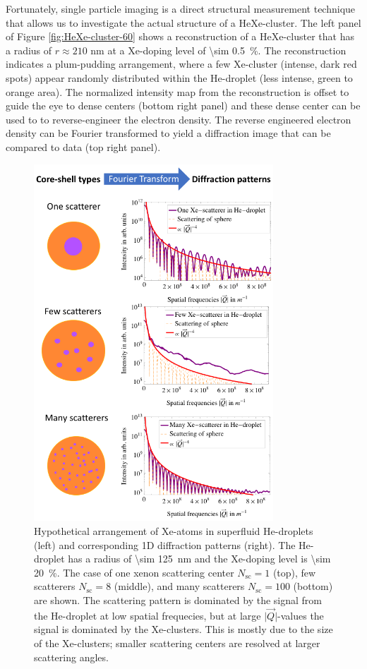 Fortunately, single particle imaging is a direct structural measurement technique that allows us to investigate the actual structure of a HeXe-cluster. The left panel of Figure \ref{fig:HeXe-cluster-60} shows a reconstruction of a HeXe-cluster that has a radius of $r\approx 210$ nm at a Xe-doping level of \SI{\sim 0.5}{\percent}. The reconstruction indicates a plum-pudding arrangement, where a few Xe-cluster (intense, dark red spots) appear randomly distributed within the He-droplet (less intense, green to orange area). The normalized intensity map from the reconstruction is offset to guide the eye to dense centers (bottom right panel) and these dense center can be used to to reverse-engineer the electron density. The reverse engineered electron density can be Fourier transformed to yield a diffraction image that can be compared to data (top right panel).
%
\begin{figure}
 	\centering
 		\includegraphics[width=0.80\textwidth]{images/results/plum-pudding.png}
 	\caption[Hypothetical arrangement of Xe-clusters within He-droplets.]{Hypothetical arrangement of Xe-atoms in superfluid He-droplets (left) and corresponding 1D diffraction patterns (right). The He-droplet has a radius of \SI{\sim 125}{\nano\meter} and the Xe-doping level is \SI{\sim 20}{\percent}. The case of one xenon scattering center $N_{\text{sc}}=1$ (top), few scatterers $N_{\text{sc}}=8$ (middle), and many scatterers $N_{\text{sc}}=100$ (bottom) are shown. The scattering pattern is dominated by the signal from the He-droplet at low spatial frequecies, but at large $\lvert\vec{Q}\rvert$-values the signal is dominated by the Xe-clusters. This is mostly due to the size of the Xe-clusters; smaller scattering centers are resolved at larger scattering angles.}
 	\label{fig:HeXe-plum-pudding}
\end{figure}
